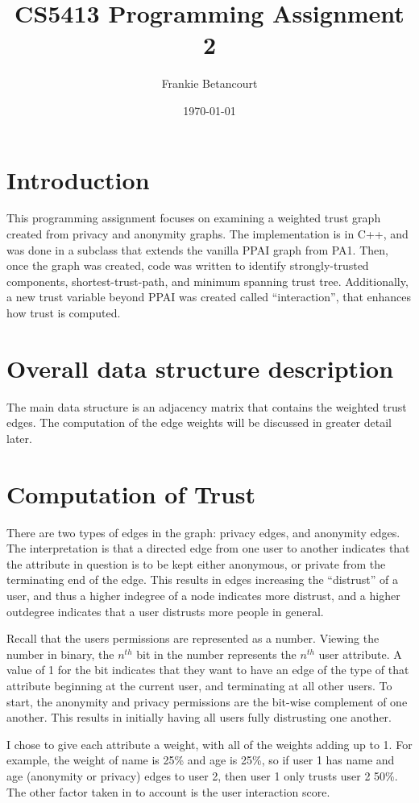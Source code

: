 \documentclass{article}
\title{CS5413 Programming Assignment 2}
\author{Frankie Betancourt }
\date{\today}
\begin{document}
\maketitle

\section{Introduction}
This programming assignment focuses on examining a weighted trust graph created
from privacy and anonymity graphs. The implementation is in C++, and was done 
in a subclass that extends the vanilla PPAI graph from PA1. Then, once the graph was
created, code was written to identify strongly-trusted components, 
shortest-trust-path, and minimum spanning trust tree. Additionally, a new trust 
variable beyond PPAI was created called ``interaction'', that enhances how trust
is computed. 

\section{Overall data structure description} 
The main data structure is an adjacency matrix that contains the weighted trust edges.
The computation of the edge weights will be discussed in greater detail later. 

\section{Computation of Trust} 
There are two types of edges in the graph: privacy edges, and anonymity edges. The
interpretation is that a directed edge from one user to another indicates that the 
attribute in question is to be kept either anonymous, or private from the terminating
end of the edge. This results in edges increasing the ``distrust'' of a user, and thus
a higher indegree of a node indicates more distrust, and a higher outdegree indicates
that a user distrusts more people in general. 

Recall that the users permissions are represented as a number. Viewing the number in
binary, the \(n^{th}\) bit in the number represents the \(n^{th}\) user attribute. A
value of 1 for the bit indicates that they want to have an edge of the type of   
that attribute beginning at the current user, and terminating at all other      
users. To start, the anonymity and privacy permissions are the bit-wise complement of 
one another. This results in initially having all users fully distrusting one another.

I chose to give each attribute a weight, with all of the weights adding up to 1. For 
example, the weight of name is 25\% and age is 25\%, so if user 1 has name and age
(anonymity or privacy) edges to user 2, then user 1 only trusts user 2 50\%. The other
factor taken in to account is the user interaction score. 
\end{document}
